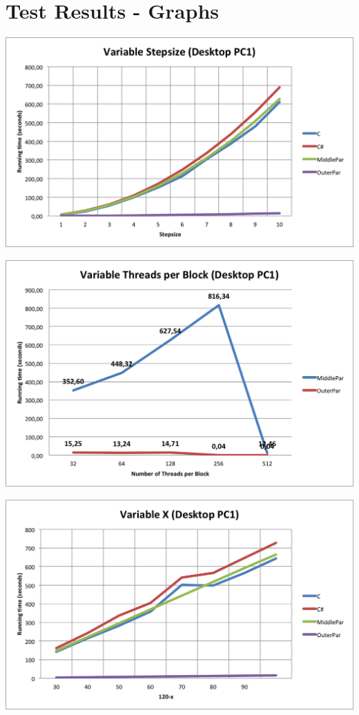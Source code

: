 \appendix
\section{Test Results - Graphs}
\label{app:graphs}

\centerline{\includegraphics[width=\textwidth]{img/desktop-stepsize.png}} 

\centerline{\includegraphics[width=\textwidth]{img/desktop-tpb.png}}

\centerline{\includegraphics[width=\textwidth]{img/desktop-varx.png}}

